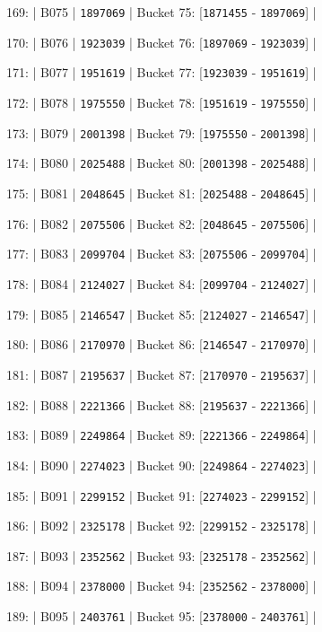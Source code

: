 \documentclass[11pt,a4paper]{article}
\begin{document}
169: | B075 | \texttt{1897069} | Bucket 75: [\texttt{1871455} - \texttt{1897069}] |

170: | B076 | \texttt{1923039} | Bucket 76: [\texttt{1897069} - \texttt{1923039}] |

171: | B077 | \texttt{1951619} | Bucket 77: [\texttt{1923039} - \texttt{1951619}] |

172: | B078 | \texttt{1975550} | Bucket 78: [\texttt{1951619} - \texttt{1975550}] |

173: | B079 | \texttt{2001398} | Bucket 79: [\texttt{1975550} - \texttt{2001398}] |

174: | B080 | \texttt{2025488} | Bucket 80: [\texttt{2001398} - \texttt{2025488}] |

175: | B081 | \texttt{2048645} | Bucket 81: [\texttt{2025488} - \texttt{2048645}] |

176: | B082 | \texttt{2075506} | Bucket 82: [\texttt{2048645} - \texttt{2075506}] |

177: | B083 | \texttt{2099704} | Bucket 83: [\texttt{2075506} - \texttt{2099704}] |

178: | B084 | \texttt{2124027} | Bucket 84: [\texttt{2099704} - \texttt{2124027}] |

179: | B085 | \texttt{2146547} | Bucket 85: [\texttt{2124027} - \texttt{2146547}] |

180: | B086 | \texttt{2170970} | Bucket 86: [\texttt{2146547} - \texttt{2170970}] |

181: | B087 | \texttt{2195637} | Bucket 87: [\texttt{2170970} - \texttt{2195637}] |

182: | B088 | \texttt{2221366} | Bucket 88: [\texttt{2195637} - \texttt{2221366}] |

183: | B089 | \texttt{2249864} | Bucket 89: [\texttt{2221366} - \texttt{2249864}] |

184: | B090 | \texttt{2274023} | Bucket 90: [\texttt{2249864} - \texttt{2274023}] |

185: | B091 | \texttt{2299152} | Bucket 91: [\texttt{2274023} - \texttt{2299152}] |

186: | B092 | \texttt{2325178} | Bucket 92: [\texttt{2299152} - \texttt{2325178}] |

187: | B093 | \texttt{2352562} | Bucket 93: [\texttt{2325178} - \texttt{2352562}] |

188: | B094 | \texttt{2378000} | Bucket 94: [\texttt{2352562} - \texttt{2378000}] |

189: | B095 | \texttt{2403761} | Bucket 95: [\texttt{2378000} - \texttt{2403761}] |
\end{document}
